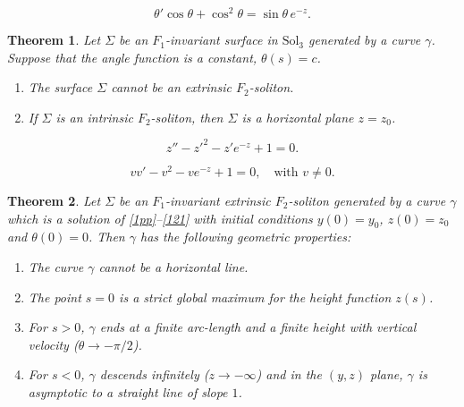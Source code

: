 \documentclass[10pt,a4paper]{amsart}
\newtheorem{theorem}{Theorem}
\def\sol{\text{Sol}_3}
\begin{document}
 \begin{equation}\label{121}
 \theta' \cos\theta+ \cos^2\theta = \sin\theta\, e^{-z}.
 \end{equation}

\begin{theorem}\label{t52}
Let $\Sigma$ be an $F_1$-invariant surface in $\sol$ generated by a curve $\gamma$. Suppose that the angle function is a constant, $\theta(s)=c$.
\begin{enumerate}
 \item The surface $\Sigma$ cannot be an extrinsic $F_2$-soliton.
 \item If $\Sigma$ is an intrinsic $F_2$-soliton, then $\Sigma$ is a horizontal plane $z = z_0$.
\end{enumerate}
\end{theorem}

\begin{equation}\label{211}
z'' - z'^2 - z' e^{-z} + 1 = 0.
\end{equation}

 \begin{equation}\label{eq211}
v v' - v^2 - v e^{-z} + 1 = 0, \quad \text{with } v \neq 0.
\end{equation} 

 \begin{theorem} \label{t55}
Let $\Sigma$ be an $F_1$-invariant extrinsic $F_2$-soliton generated by a curve $\gamma$ which is a solution of \eqref{1pp}--\eqref{121} with initial conditions $y(0)=y_0$, $z(0)=z_0$ and $\theta(0)=0$. Then $\gamma$ has the following geometric properties: 
\begin{enumerate}
 \item The curve $\gamma$ cannot be a horizontal line.
 \item The point $s=0$ is a strict global maximum for the height function $z(s)$. 
 \item For $s>0$, $\gamma$ ends at a finite arc-length and a finite height with vertical velocity ($\theta \to -\pi/2$).
 \item For $s<0$, $\gamma$ descends infinitely ($z \to -\infty$) and in the $(y,z)$ plane, $\gamma$ is asymptotic to a straight line of slope $ 1$.
\end{enumerate}
\end{theorem}
\end{document}
